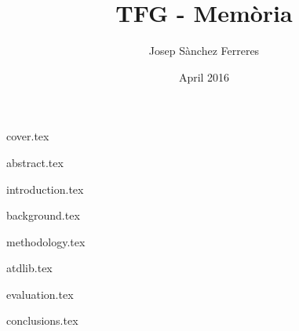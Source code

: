 \documentclass[10pt,a4paper]{report}
\title{TFG - Memòria}
\author{Josep Sànchez Ferreres}
\date{April 2016}
\begin{document}
\cite{gurobi}

\maketitle

\tableofcontents

{cover.tex}

{abstract.tex}

{introduction.tex}

{background.tex}

{methodology.tex}

{atdlib.tex}

{evaluation.tex}

{conclusions.tex}

\printbibliography[heading=bibliography]{}
\end{document}
